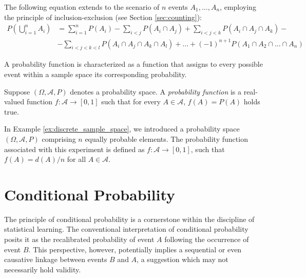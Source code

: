 The following equation extends to the scenario of $n$ events $A_1, \ldots, A_n$, employing the principle of inclusion-exclusion (see Section \ref{sec:counting}):
\begin{equation*}
\begin{split}
P \left( \bigcup_{i=1}^n A_i \right) & = \sum_{i=1}^n P \left( A_i \right) - \sum_{i<j} P \left( A_i \cap A_j \right) + \sum_{i<j<k} P \left( A_i \cap A_j \cap A_k \right) - \\
&  - \sum_{i<j<k<l} P \left( A_i \cap A_j \cap A_k \cap A_l \right) + \ldots +  (-1)^{n+1} P \left( A_1 \cap A_2 \cap \ldots \cap A_n \right) 
\end{split}
\end{equation*}

A probability function is characterized as a function that assigns to every possible event within a sample space its corresponding probability.

\begin{definition}
\label{def:probability_function}
Suppose $\left( \Omega, \mathcal{A} , P \right)$ denotes a probability space. A \emph{probability function} is a real-valued function $f : \mathcal{A} \rightarrow [0, 1]$ such that for every $A \in \mathcal{A}$, $f \left( A \right) = P \left( A \right)$ holds true.
\end{definition}

In Example \ref{ex:discrete_sample_space}, we introduced a probability space $\left( \Omega, \mathcal{A}, P \right)$ comprising $n$ equally probable elements. The probability function associated with this experiment is defined as $f : \mathcal{A} \rightarrow [0, 1]$, such that $f \left( A \right) = d\left( A \right)/n$ for all $A \in \mathcal{A}$.

%
%

\section{Conditional Probability}
\label{sec:probability_conditional}

The principle of conditional probability is a cornerstone within the discipline of statistical learning. The conventional interpretation of conditional probability posits it as the recalibrated probability of event $A$ following the occurrence of event $B$. This perspective, however, potentially implies a sequential or even causative linkage between events $B$ and $A$, a suggestion which may not necessarily hold validity.

